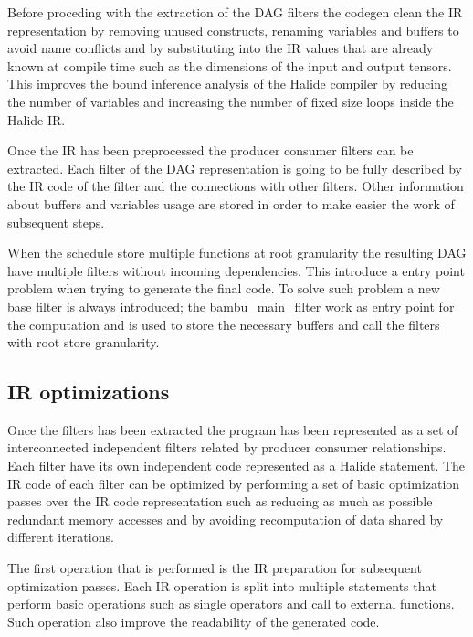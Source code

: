 \documentclass[../main.tex]{subfiles}
\begin{document}
Before proceding with the extraction of the DAG filters the codegen clean the IR representation by removing unused constructs, renaming variables and buffers to avoid name conflicts and by substituting into the IR values that are already known at compile time such as the dimensions of the input and output tensors. 
This improves the bound inference analysis of the Halide compiler by reducing the number of variables and increasing the number of fixed size loops inside the Halide IR. 

Once the IR has been preprocessed the producer consumer filters can be extracted.
Each filter of the DAG representation is going to be fully described by the IR code of the filter and the connections with other filters.
Other information about buffers and variables usage are stored in order to make easier the work of subsequent steps.

When the schedule store multiple functions at root granularity the resulting DAG have multiple filters without incoming dependencies. 
This introduce a entry point problem when trying to generate the final code. 
To solve such problem a new base filter is always introduced; the bambu\_main\_filter work as entry point for the computation and is used to store the necessary buffers and call the filters with root store granularity.

\subsection{IR optimizations}
Once the filters has been extracted the program has been represented as a set of interconnected independent filters related by producer consumer relationships. Each filter have its own independent code represented as a Halide statement. The IR code of each filter can be optimized by performing a set of basic optimization passes over the IR code representation such as reducing as much as possible redundant memory accesses and by avoiding recomputation of data shared by different iterations.

The first operation that is performed is the IR preparation for subsequent optimization passes. Each IR operation is split into multiple statements that perform basic operations such as single operators and call to external functions.
Such operation also improve the readability of the generated code.
\end{document}

